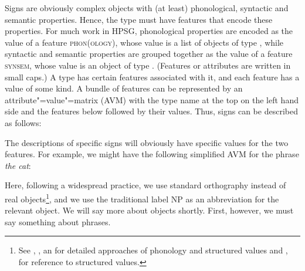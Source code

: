 \documentclass[output=paper
	        ,collection
	        ,collectionchapter
 	        ,biblatex
                ,babelshorthands
                ,newtxmath
                ,draftmode
                ,colorlinks, citecolor=brown
]{langscibook}
\begin{document}
Signs are obviously complex objects with (at least) phonological, syntactic and semantic properties. Hence, the type  must have features that encode these properties. For much work in HPSG, phonological properties are encoded as the value of a feature \textsc{phon(ology)}, whose value is a list of objects of type , while syntactic and semantic properties are grouped together as the value of a feature \textsc{synsem}, whose value is an object of type . (Features or attributes are written in small caps.) A type has certain features associated with it, and each feature has a value of some kind. A bundle of features can be represented by an attribute"=value"=matrix (AVM) with the type name at the top on the left hand side and the features below followed by their values. Thus, signs can be described as follows:


\ea\label{ex:prop4}
\z


The descriptions of specific signs will obviously have specific values for the two features. For example, we might have the following simplified AVM for the phrase \emph{the cat}:

\ea\label{ex:prop5}
\z


Here, following a widespread practice, we use standard orthography instead of real 
objects\footnote{%
See \citet{BK94b}, \citet{Hoehle99a-u}, an \citet{Walther99a-u} for detailed approaches of phonology and structured \phon values and ,  for reference to structured \phon values.
},
and we use the traditional label NP as an abbreviation for the relevant  object. We will say more about  objects shortly. First, however, we must say something about phrases.
\end{document}
